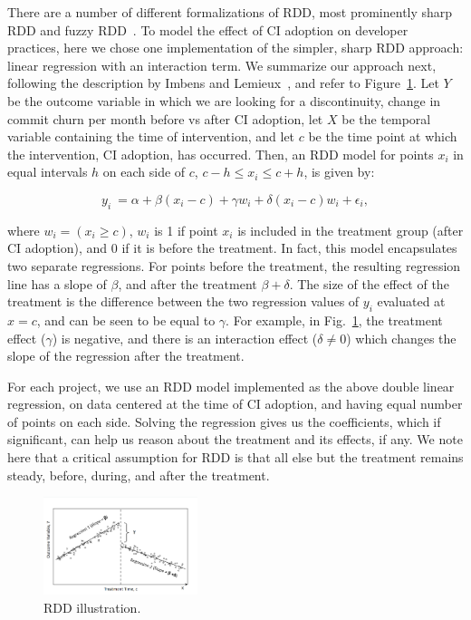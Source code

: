 There are a number of different formalizations of RDD, most prominently 
sharp RDD and fuzzy RDD~\cite{imbens2008regression}.
To model the effect of CI adoption on developer practices, here we chose one implementation
of the simpler, sharp RDD approach: linear regression with an interaction term.
We summarize our approach next, following the description by Imbens and 
Lemieux~\cite{imbens2008regression}, and refer to Figure~\ref{RDDIllustration}.
Let $Y$ be the outcome variable in which we are looking for a discontinuity, 
\eg change in commit churn per month before vs after CI adoption, let $X$ be the temporal variable containing the 
time of intervention, and let $c$ be the time point at which the intervention, \eg CI adoption, has occurred.
Then, an RDD model for points $x_i$ in equal intervals $h$ on each side of 
$c$, $c-h \le x_i \le c+h$, is given by:

\[y_i \ = \alpha + \beta(x_i-c) + \gamma w_i + \delta(x_i-c)w_i + \epsilon_i,\]

\noindent where $w_i = (x_i \geq c)$, \ie $w_i$ is 1 if point $x_i$ is included in 
the treatment group (\eg after CI adoption), and 0 if it is before the treatment.
In fact, this model encapsulates two separate regressions.
For points before the treatment, the resulting regression line has a slope of 
$\beta$, and after the treatment $\beta + \delta$.
The size of the effect of the treatment is the difference between the two 
regression values of $y_i$ evaluated at $x=c$, and can be seen to be equal 
to $\gamma$.
For example, in Fig.~\ref{RDDIllustration}, the treatment effect ($\gamma$) is negative, and there is an interaction effect ($\delta \neq 0$) which changes the slope of the regression after the treatment.

For each project, we use an RDD model implemented as the above 
double linear regression, on data centered at the time of CI adoption, and 
having equal number of points on each side.
Solving the regression gives us the coefficients, which if significant, can help us reason about the treatment and its effects, if any.
We note here that a critical assumption for RDD is that all else but the treatment remains steady, before, during, and after the treatment.

\begin{figure}[t]
	\centering
	\includegraphics[width=0.4\textwidth, clip=true, trim=0 15 15 50]{RDD_plot.png}
	\caption{RDD illustration.}\vspace{-0.5cm}
	\label{RDDIllustration}
\end{figure}

